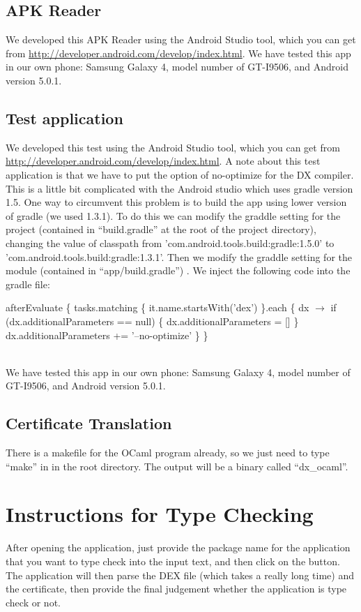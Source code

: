 \documentclass[a4]{article}
\begin{document}
\subsection{APK Reader}
We developed this APK Reader using the Android Studio tool, which you can get from
\href{http://developer.android.com/develop/index.html}{http://developer.android.com/develop/index.html}. 
We have tested this app in our own phone: Samsung Galaxy 4, model number of 
GT-I9506, and Android version 5.0.1. 

\subsection{Test application}
We developed this test using the Android Studio tool, which you can get from
\href{http://developer.android.com/develop/index.html}{http://developer.android.com/develop/index.html}. 
A note about this test application is that we have to put the option of no-optimize for
the DX compiler. This is a little bit complicated with the Android studio which uses
gradle version 1.5. One way to circumvent this problem is to build the app using
lower version of gradle (we used 1.3.1). To do this we can modify the graddle setting
for the project (contained in ``build.gradle'' at the root of the project directory), 
changing the value of classpath from 'com.android.tools.build:gradle:1.5.0' to 
'com.android.tools.build:gradle:1.3.1'.
Then we modify the graddle setting for the module (contained in ``app/build.gradle'') .
We inject the following code into the gradle file:
\begin{algorithm}
\begin{algorithmic}
\STATE afterEvaluate \{
\STATE \hspace{0.5cm}tasks.matching \{ it.name.startsWith('dex') \}.each \{ dx $\rightarrow$
\STATE \hspace{0.5cm}if (dx.additionalParameters == null) \{ dx.additionalParameters = [] \}
\STATE \hspace{0.5cm}dx.additionalParameters += '--no-optimize' \}
\STATE \}
\end{algorithmic}
\end{algorithm}\\
We have tested this app in our own phone: Samsung Galaxy 4, model number of 
GT-I9506, and Android version 5.0.1. 

\subsection{Certificate Translation}
There is a makefile for the OCaml program already, so we just need to type ``make'' in
in the root directory. The output will be a binary called ``dx\_ocaml''.

\section{Instructions for Type Checking}
After opening the application, just provide the package name for the application that
you want to type check into the input text, and then click on the button. The application
will then parse the DEX file (which takes a really long time) and the certificate, then
provide the final judgement whether the application is type check or not.
\end{document}
